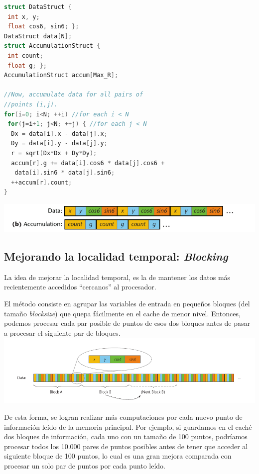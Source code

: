 \begin{lstlisting}[language=C]
struct DataStruct {
 int x, y;
 float cos6, sin6; };
DataStruct data[N];
struct AccumulationStruct {
 int count;
 float g; };
AccumulationStruct accum[Max_R];

//Now, accumulate data for all pairs of
//points (i,j).
for(i=0; i<N; ++i) //for each i < N
 for(j=i+1; j<N; ++j) { //for each j < N
  Dx = data[i].x - data[j].x;
  Dy = data[i].y - data[j].y;
  r = sqrt(Dx*Dx + Dy*Dy);
  accum[r].g += data[i].cos6 * data[j].cos6 +
   data[i].sin6 * data[j].sin6;
  ++accum[r].count;
}
\end{lstlisting}


\begin{center}
\includegraphics[scale=0.6]{images/array-2.png}
\end{center}

\subsection{Mejorando la localidad temporal: \emph{Blocking}}

La idea de mejorar la localidad temporal, es la de mantener los datos más recientemente accedidos
``cercanos'' al procesador.

El método consiste en agrupar las variables de entrada en pequeños bloques (del tamaño
\emph{blocksize}) que quepa fácilmente en el cache de menor nivel. Entonces, podemos procesar cada
par posible de puntos de esos dos bloques antes de pasar a procesar el siguiente par de bloques.
\includegraphics[scale=0.7]{images/figure4}

De esta forma, se logran realizar más computaciones por cada nuevo punto de información leído de la
memoria principal. Por ejemplo, si guardamos en el caché dos bloques de información, cada uno con un
tamaño de 100 puntos, podríamos procesar todos los 10.000 pares de puntos posibles antes de tener que
acceder al siguiente bloque de 100 puntos, lo cual es una gran mejora comparada con procesar un solo par
de puntos por cada punto leído.

